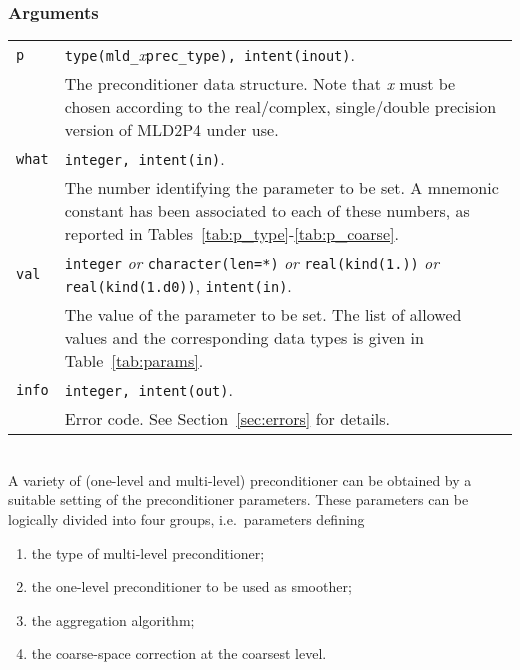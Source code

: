 \subsubsection*{Arguments}

\begin{tabular}{p{1.2cm}p{11.5cm}}
\verb|p|      & \verb|type(mld_|\emph{x}\verb|prec_type), intent(inout)|.\\
              & The preconditioner data structure. Note that \emph{x} must
                be chosen according to the real/complex, single/double precision
                 version of MLD2P4 under use.\\
\verb|what|   & \verb|integer, intent(in)|. \\
              & The number identifying the parameter to be set.
                A mnemonic constant has been associated to each of these
                numbers, as reported in Tables~\ref{tab:p_type}-\ref{tab:p_coarse}.\\
\verb|val |   & \verb|integer| \emph{or} \verb|character(len=*)| \emph{or}
                \verb|real(kind(1.))| \emph{or} \verb|real(kind(1.d0))|,
                \verb|intent(in)|.\\
              & The value of the parameter to be set. The list of allowed
                values and the corresponding data types is given in
                Table~\ref{tab:params}.\\
\verb|info|   & \verb|integer, intent(out)|.\\
              & Error code. See Section~\ref{sec:errors} for details.\\
\end{tabular}

\ \\
A variety of (one-level and multi-level) preconditioner can be obtained
by a suitable setting of the preconditioner parameters. These parameters
can be logically divided into four groups, i.e.\ parameters defining
\begin{enumerate}
	\item the type of multi-level preconditioner;
	\item the one-level preconditioner to be used as smoother;
	\item the aggregation algorithm;
	\item the coarse-space correction at the coarsest level.
\end{enumerate}

